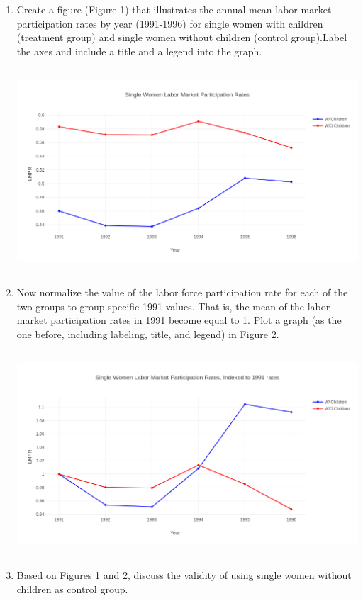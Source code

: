 \documentclass{article}
\begin{document}
\begin{enumerate}[label=\alph*]
\item  Create a figure (Figure 1) that illustrates the annual mean labor market participation rates by year (1991-1996) for single women with children (treatment group) and single women without children (control group).Label the axes and include a title and a legend into the graph.


\includegraphics[width=5in, height=3in]{newplot}



\item Now normalize the value of the labor force participation rate for each of the two groups to group-specific 1991 values. That is, the mean of the labor  market participation rates in 1991 become equal to 1. Plot a graph (as the one before, including labeling, title, and legend) in Figure 2.



\includegraphics[width=5in, height=3in]{figure2}




\item  Based on Figures 1 and 2, discuss the validity of using single women without children as control group.


\end{enumerate}
\end{document}
